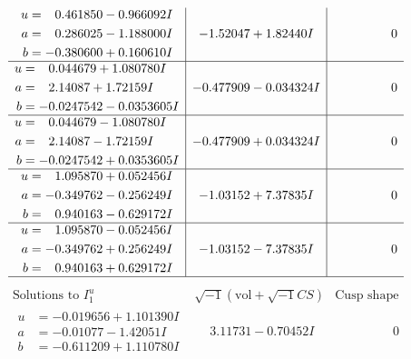 \documentclass[1p]{elsarticle_modified}
\theoremstyle{definition}
\newcommand{\I}{\sqrt{-1}}
\begin{document}
$$\begin{array}{c|c|c}
\begin{aligned}
u &= \phantom{-}0.461850 - 0.966092 I \\
a &= \phantom{-}0.286025 - 1.188000 I \\
b &= -0.380600 + 0.160610 I\end{aligned}
 & -1.52047 + 1.82440 I & \phantom{-0.000000 } 0 \\ \hline\begin{aligned}
u &= \phantom{-}0.044679 + 1.080780 I \\
a &= \phantom{-}2.14087 + 1.72159 I \\
b &= -0.0247542 - 0.0353605 I\end{aligned}
 & -0.477909 - 0.034324 I & \phantom{-0.000000 } 0 \\ \hline\begin{aligned}
u &= \phantom{-}0.044679 - 1.080780 I \\
a &= \phantom{-}2.14087 - 1.72159 I \\
b &= -0.0247542 + 0.0353605 I\end{aligned}
 & -0.477909 + 0.034324 I & \phantom{-0.000000 } 0 \\ \hline\begin{aligned}
u &= \phantom{-}1.095870 + 0.052456 I \\
a &= -0.349762 - 0.256249 I \\
b &= \phantom{-}0.940163 - 0.629172 I\end{aligned}
 & -1.03152 + 7.37835 I & \phantom{-0.000000 } 0 \\ \hline\begin{aligned}
u &= \phantom{-}1.095870 - 0.052456 I \\
a &= -0.349762 + 0.256249 I \\
b &= \phantom{-}0.940163 + 0.629172 I\end{aligned}
 & -1.03152 - 7.37835 I & \phantom{-0.000000 } 0\\
 \hline 
 \end{array}$$\newpage$$\begin{array}{c|c|c}  
\text{Solutions to }I^u_{1}& \I (\text{vol} + \sqrt{-1}CS) & \text{Cusp shape}\\
 \hline 
\begin{aligned}
u &= -0.019656 + 1.101390 I \\
a &= -0.01077 - 1.42051 I \\
b &= -0.611209 + 1.110780 I\end{aligned}
 & \phantom{-}3.11731 - 0.70452 I & \phantom{-0.000000 } 0 \\ \hline\begin{aligned}

\end{aligned}
\end{array}$$
\end{document}
